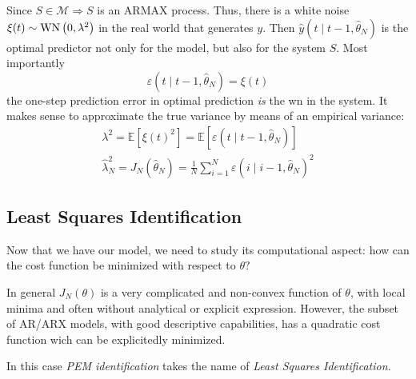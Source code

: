 Since $ S\in \mathcal{M} \Longrightarrow S$ is an ARMAX process. Thus, there is a white noise $ \xi (t) \sim \operatorname{WN}\left(0,\lambda ^{2}\right)$ in the real world that generates $y$. Then $ \hat{y}(t\mid t-1,\hat{\theta }_{N})$ is the optimal predictor not only for the model, but also for the system $S$. Most importantly
\begin{equation*}
\varepsilon (t\mid t-1,\hat{\theta }_{N}) =\xi (t)
\end{equation*}
the one-step prediction error in optimal prediction \textit{is} the \gls{wn} in the system. It makes sense to approximate the true variance by means of an empirical variance:
\begin{gather*}
\lambda ^{2} =\mathbb{E}\left[ \xi (t)^{2}\right] =\mathbb{E}[ \varepsilon (t\mid t-1,\hat{\theta }_{N})]\\
\hat{\lambda }_{N}^{2} =J_{N}(\hat{\theta }_{N}) =\frac{1}{N}\sum _{i=1}^{N} \varepsilon (i\mid i-1,\hat{\theta }_{N})^{2}
\end{gather*}

\subsection{Least Squares Identification}
Now that we have our model, we need to study its computational aspect: how can the cost function be minimized with respect to $ \theta ?$

In general $ J_{N}(\theta)$ is a very complicated and non-convex function of $ \theta $, with local minima and often without analytical or explicit expression. However, the subset of AR/ARX models, with good descriptive capabilities, has a quadratic cost function wich can be explicitedly minimized.

In this case \textit{PEM identification} takes the name of \textit{Least Squares Identification.}

